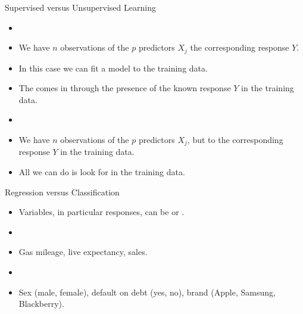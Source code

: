 \documentclass[mathserif, aspectratio=169]{beamer}
\begin{document}
\begin{frame}{Supervised versus Unsupervised Learning}
	\begin{cpage}
		\begin{itemize}
			\item[] 
			\item We have $n$ observations of the $p$ predictors $X_j$ 
				the corresponding response $Y$.
			\item In this case we can fit a model to the training data.
			\item The  comes in through the presence of the known
				response $Y$ in the training data.
			\item[] 
			\item We have $n$ observations of the $p$ predictors $X_j$,
				but  to the corresponding response $Y$ in the training data.
			\item All we can do is look for  in the training data.
		\end{itemize}
	\end{cpage}
\end{frame}

\begin{frame}{Regression versus Classification}
	\begin{itemize}
		\item Variables, in particular responses, can be  or
			.
		\item[] 
		\item Gas mileage, live expectancy, sales. 
		\item[] 
		\item Sex (male, female), default on debt (yes, no), brand (Apple, Samsung, Blackberry).
	\end{itemize}
\end{frame}
\end{document}
